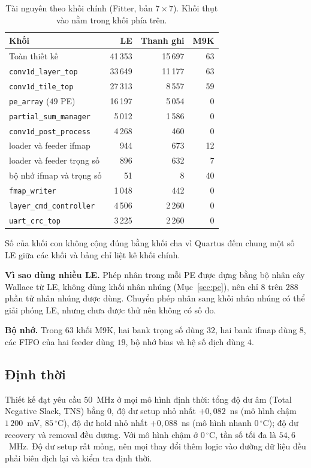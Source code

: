 \begin{table}[htbp]\centering
\caption{Tài nguyên theo khối chính (Fitter, bản $7\times7$).
Khối thụt vào nằm trong khối phía trên.}\label{tab:taiguyenkhoi}
\small\setlength{\tabcolsep}{5pt}
\begin{tabular}{@{}lrrr@{}}
\toprule
Khối & LE & Thanh ghi & M9K \\ \midrule
Toàn thiết kế & 41\,353 & 15\,697 & 63 \\
\quad \texttt{conv1d\_layer\_top} & 33\,649 & 11\,177 & 63 \\
\quad\quad \texttt{conv1d\_tile\_top} & 27\,313 & 8\,557 & 59 \\
\quad\quad\quad \texttt{pe\_array} ($49$ PE) & 16\,197 & 5\,054 & 0 \\
\quad\quad\quad \texttt{partial\_sum\_manager} & 5\,012 & 1\,586 & 0 \\
\quad\quad\quad \texttt{conv1d\_post\_process} & 4\,268 & 460 & 0 \\
\quad\quad\quad loader và feeder ifmap & 944 & 673 & 12 \\
\quad\quad\quad loader và feeder trọng số & 896 & 632 & 7 \\
\quad\quad\quad bộ nhớ ifmap và trọng số & 51 & 8 & 40 \\
\quad\quad \texttt{fmap\_writer} & 1\,048 & 442 & 0 \\
\quad \texttt{layer\_cmd\_controller} & 4\,506 & 2\,260 & 0 \\
\quad \texttt{uart\_crc\_top} & 3\,225 & 2\,260 & 0 \\ \bottomrule
\end{tabular}

\smallskip
\footnotesize Số của khối con không cộng đúng bằng khối cha vì Quartus đếm chung một số LE giữa các khối và bảng chỉ liệt kê khối chính.
\end{table}

\textbf{Vì sao dùng nhiều LE.}
Phép nhân trong mỗi PE được dựng bằng bộ nhân cây Wallace từ LE, không dùng khối nhân nhúng (Mục~\ref{sec:pe}), nên chỉ $8$ trên $288$ phần tử nhân nhúng được dùng.
Chuyển phép nhân sang khối nhân nhúng có thể giải phóng LE, nhưng chưa được thử nên không có số đo.

\textbf{Bộ nhớ.}
Trong $63$ khối M9K, hai bank trọng số dùng $32$, hai bank ifmap dùng $8$, các FIFO của hai feeder dùng $19$, bộ nhớ bias và hệ số dịch dùng $4$.

\subsection{Định thời}
Thiết kế đạt yêu cầu $50$~MHz ở mọi mô hình định thời: tổng độ dư âm (Total Negative Slack, TNS) bằng $0$, độ dư setup nhỏ nhất $+0{,}082$~ns (mô hình chậm $1\,200$~mV, $85\,^\circ$C), độ dư hold nhỏ nhất $+0{,}088$~ns (mô hình nhanh $0\,^\circ$C); độ dư recovery và removal đều dương.
Với mô hình chậm ở $0\,^\circ$C, tần số tối đa là $54{,}6$~MHz.
Độ dư setup rất mỏng, nên mọi thay đổi thêm logic vào đường dữ liệu đều phải biên dịch lại và kiểm tra định thời.
